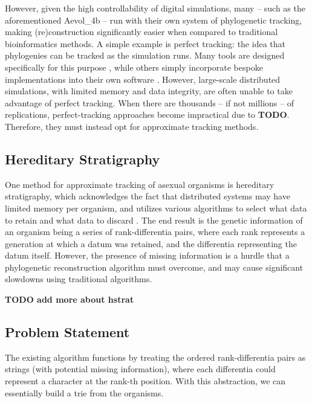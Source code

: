 However, given the high controllability of digital simulations, many -- such as the aforementioned Aevol\_4b -- run with their own system of phylogenetic tracking, making (re)construction significantly easier when compared to traditional bioinformatics methods. A simple example is perfect tracking: the idea that phylogenies can be tracked as the simulation runs. Many tools are designed specifically for this purpose \citep{dolson2024phylotrack}, while others simply incorporate bespoke implementations into their own software \citep{ofria2004avida}. However, large-scale distributed simulations, with limited memory and data integrity, are often unable to take advantage of perfect tracking. When there are thousands -- if not millions -- of replications, perfect-tracking approaches become impractical due to \textbf{TODO}. Therefore, they must instead opt for approximate tracking methods.

\subsection{Hereditary Stratigraphy} \label{sec:introduction:hstrat}

One method for approximate tracking of asexual organisms is hereditary stratigraphy, which acknowledges the fact that distributed systems may have limited memory per organism, and utilizes various algorithms to select what data to retain and what data to discard \citep{moreno2022hstrat}. The end result is the genetic information of an organism being a series of rank-differentia pairs, where each rank represents a generation at which a datum was retained, and the differentia representing the datum itself. However, the presence of missing information is a hurdle that a phylogenetic reconstruction algorithm must overcome, and may cause significant slowdowns using traditional algorithms.



\textbf{TODO add more about hstrat}

\subsection{Problem Statement} \label{sec:introduction:problem}

The existing algorithm functions by treating the ordered rank-differentia pairs as strings (with potential missing information), where each differentia could represent a character at the rank-th position. With this abstraction, we can essentially build a trie \citep{fredkin1960trie} from the organisms. 

